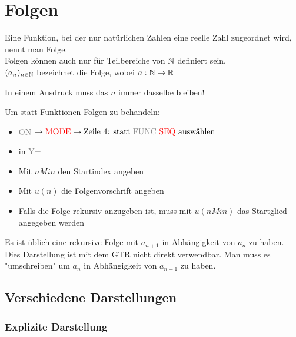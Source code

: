 \chapter{Folgen}



\begin{Definition}
Eine Funktion, bei der nur natürlichen Zahlen eine reelle Zahl zugeordnet wird, nennt man Folge.\\
Folgen können auch nur für Teilbereiche von $\mathbb{N}$ definiert sein.\\
$(a_{n})_{n\in\mathbb{N}}$ bezeichnet die Folge, wobei $a:\mathbb{N}\rightarrow\mathbb{R}$
\end{Definition}

\begin{Bemerkung}
In einem Ausdruck muss das $n$ immer dasselbe bleiben!
\end{Bemerkung}


\begin{GTR-Tipp}
Um statt Funktionen Folgen zu behandeln:
\begin{itemize}
\item\textcolor{gray}{ON} $\rightarrow \textcolor{red}{\text{MODE}} \rightarrow \text{Zeile 4: statt \textcolor{gray}{FUNC} \textcolor{red}{SEQ} auswählen}$
\item in \textcolor{gray}{Y=}
\item Mit $nMin$ den Startindex angeben
\item Mit $u(n)$ die Folgenvorschrift angeben
\item Falls die Folge rekursiv anzugeben ist, muss mit $u(nMin)$ das Startglied angegeben werden
\end{itemize}
\end{GTR-Tipp}

\begin{Bemerkung}
Es ist üblich eine rekursive Folge mit $a_{n+1}$ in Abhängigkeit von $a_n$ zu haben. Dies Darstellung ist mit dem GTR nicht direkt verwendbar. Man muss es "umschreiben" um $a_n$ in Abhängigkeit von $a_{n-1}$ zu haben.
\end{Bemerkung}

		\section{Verschiedene Darstellungen}


	\subsection{Explizite Darstellung}

